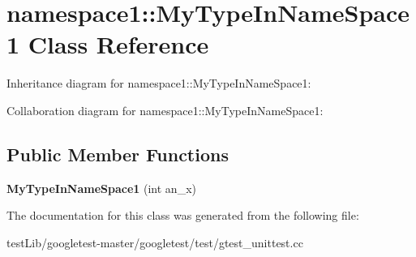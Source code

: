 \hypertarget{classnamespace1_1_1MyTypeInNameSpace1}{}\section{namespace1\+:\+:My\+Type\+In\+Name\+Space1 Class Reference}
\label{classnamespace1_1_1MyTypeInNameSpace1}


Inheritance diagram for namespace1\+:\+:My\+Type\+In\+Name\+Space1\+:


Collaboration diagram for namespace1\+:\+:My\+Type\+In\+Name\+Space1\+:
\subsection*{Public Member Functions}
\begin{DoxyCompactItemize}
\item 
\mbox{\label{classnamespace1_1_1MyTypeInNameSpace1_a2e4277aa118e9b83045a18392188a0d8}} 
{\bfseries My\+Type\+In\+Name\+Space1} (int an\+\_\+x)
\end{DoxyCompactItemize}


The documentation for this class was generated from the following file\+:\begin{DoxyCompactItemize}
\item 
test\+Lib/googletest-\/master/googletest/test/gtest\+\_\+unittest.\+cc\end{DoxyCompactItemize}
